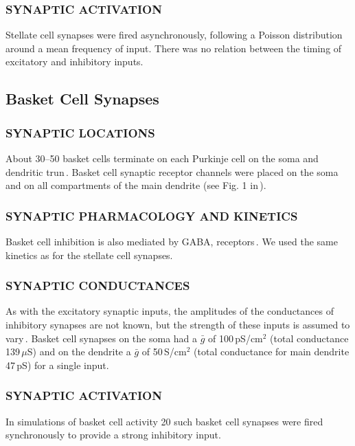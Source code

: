 \documentclass[12pt]{article}
\begin{document}
\subsubsection*{SYNAPTIC ACTIVATION}
Stellate cell synapses were fired asynchronously,
following a Poisson distribution around a mean frequency
of input. There was no relation between the timing of
excitatory and inhibitory inputs.

\subsection*{Basket Cell Synapses}

\subsubsection*{SYNAPTIC LOCATIONS}
About 30--50 basket cells terminate on each Purkinje cell on 
the soma and dendritic trun\,\cite{Palay:1974fk, Palkovits:1971vn}. 
Basket cell synaptic receptor
channels were placed on the soma and on all compartments
of the main dendrite (see Fig. 1 in\,\cite{De-Schutter-E:1994vn}).

\subsubsection*{SYNAPTIC PHARMACOLOGY AND KINETICS} 
Basket cell inhibition
is also mediated by GABA, receptors\,\cite{Gabbot:1986fk, Ito:1984uq}. 
We used the same kinetics as for the stellate cell synapses.

\subsubsection*{SYNAPTIC CONDUCTANCES}
As with the excitatory synaptic inputs,
the amplitudes of the conductances of inhibitory synapses
are not known, but the strength of these inputs is assumed to 
vary\,\cite{Bishop:1992ys}. Basket cell synapses on the soma had a $\bar g$ of
100\,pS/cm$^2$ (total conductance 139\,$\mu$S) and on the dendrite a $\bar g$ of
50\,S/cm$^2$ (total conductance for main dendrite 47\,pS) for a
single input.

\subsubsection*{SYNAPTIC ACTIVATION}
In simulations of basket cell activity 20
such basket cell synapses were fired synchronously to provide a
strong inhibitory input.



\end{document}
